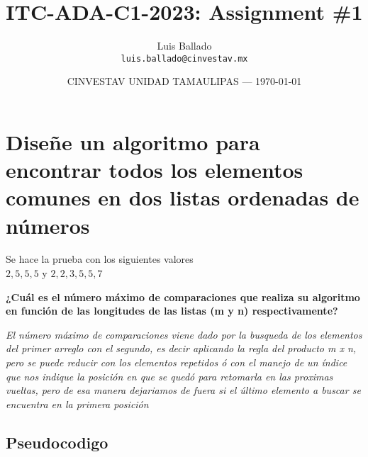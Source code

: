 \documentclass{article}
\title{ITC-ADA-C1-2023: Assignment \#1} %
\author{Luis Ballado\\ \texttt{luis.ballado@cinvestav.mx}} %
\date{CINVESTAV UNIDAD TAMAULIPAS --- \today} %
\begin{document}
\maketitle %


\section{Diseñe un algoritmo para encontrar todos los elementos comunes en dos listas ordenadas de números}

\begin{info} %
  Se hace la prueba con los siguientes valores\\
  $2,5,5,5$ y $2,2,3,5,5,7$
\end{info}

\begin{question}
  \textbf{¿Cuál es el número máximo de comparaciones que realiza su algoritmo en función de las longitudes de las listas (m y n) respectivamente?}

  \textit{El número máximo de comparaciones viene dado por la busqueda de los elementos del primer arreglo con el segundo, es decir aplicando la regla del producto m x n, pero se puede reducir con los elementos repetidos ó con el manejo de un índice que nos indique la posición en que se quedó para retomarla en las proximas vueltas, pero de esa manera dejariamos de fuera si el último elemento a buscar se encuentra en la primera posición}
    
\end{question}


\subsection{Pseudocodigo}
\end{document}
